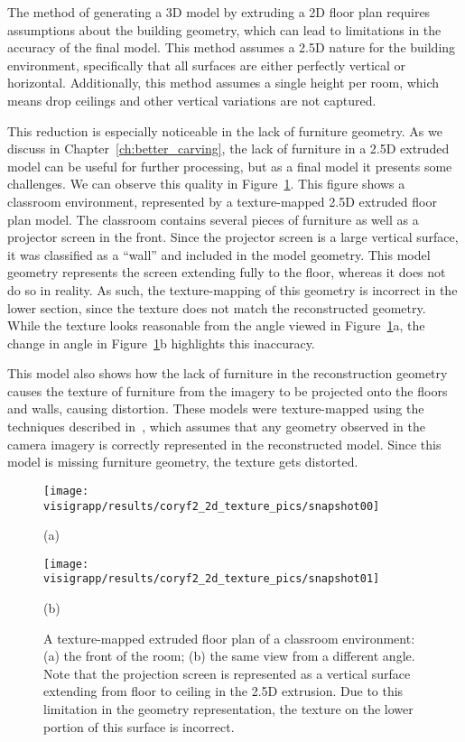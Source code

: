 \documentclass[12pt,onecolumn,oneside]{book}
\begin{document}
The method of generating a 3D model by extruding a 2D floor plan requires assumptions about the building geometry, which can lead to limitations in the accuracy of the final model.  This method assumes a 2.5D nature for the building environment, specifically that all surfaces are either perfectly vertical or horizontal.  Additionally, this method assumes a single height per room, which means drop ceilings and other vertical variations are not captured.

This reduction is especially noticeable in the lack of furniture geometry.  As we discuss in Chapter~\ref{ch:better_carving}, the lack of furniture in a 2.5D extruded model can be useful for further processing, but as a final model it presents some challenges.  We can observe this quality in Figure~\ref{fig:cory299_texture}.  This figure shows a classroom environment, represented by a texture-mapped 2.5D extruded floor plan model.  The classroom contains several pieces of furniture as well as a projector screen in the front.  Since the projector screen is a large vertical surface, it was classified as a ``wall'' and included in the model geometry.  This model geometry represents the screen extending fully to the floor, whereas it does not do so in reality.  As such, the texture-mapping of this geometry is incorrect in the lower section, since the texture does not match the reconstructed geometry.  While the texture looks reasonable from the angle viewed in Figure~\ref{fig:cory299_texture}a, the change in angle in Figure~\ref{fig:cory299_texture}b highlights this inaccuracy.  

This model also shows how the lack of furniture in the reconstruction geometry causes the texture of furniture from the imagery to be projected onto the floors and walls, causing distortion.  These models were texture-mapped using the techniques described in~\cite{Cheng14}, which assumes that any geometry observed in the camera imagery is correctly represented in the reconstructed model.  Since this model is missing furniture geometry, the texture gets distorted. 

\begin{figure}[H]
   \centering
   \begin{minipage}[b]{0.49\linewidth}
   \texttt{[image: visigrapp/results/coryf2\_2d\_texture\_pics/snapshot00]}
   \centerline{(a)}
   \end{minipage}
   \hfill
   \begin{minipage}[b]{0.49\linewidth}
   \texttt{[image: visigrapp/results/coryf2\_2d\_texture\_pics/snapshot01]}
   \centerline{(b)}
   \end{minipage}

   \caption[Limitations of 2.5D models.]{A texture-mapped extruded floor plan of a classroom environment: (a) the front of the room; (b) the same view from a different angle.  Note that the projection screen is represented as a vertical surface extending from floor to ceiling in the 2.5D extrusion.  Due to this limitation in the geometry representation, the texture on the lower portion of this surface is incorrect.
   \protect
   \label{fig:cory299_texture}}
\end{figure}
\end{document}
